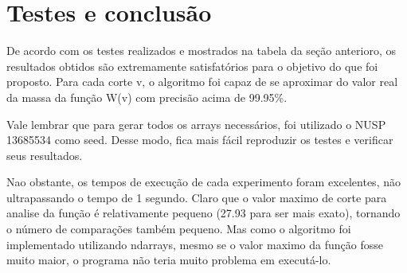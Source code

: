 \documentclass{article}
\begin{document}
    \section{Testes e conclusão}
    
    De acordo com os testes realizados e mostrados na tabela da seção anterioro, os resultados obtidos são extremamente satisfatórios para o objetivo do que foi proposto. Para cada corte v, o algoritmo foi capaz de se aproximar do valor real da massa da função W(v) com precisão acima de 99.95\%.
    
    Vale lembrar que para gerar todos os arrays necessários, foi utilizado o NUSP 13685534 como seed. Desse modo, fica mais fácil reproduzir os testes e verificar seus resultados.
    
    Nao obstante, os tempos de execução de cada experimento foram excelentes, não ultrapassando o tempo de 1 segundo. Claro que o valor maximo de corte para analise da função é relativamente pequeno (27.93 para ser mais exato), tornando o número de comparações também pequeno. Mas como o algoritmo foi implementado utilizando ndarrays, mesmo se o valor maximo da função fosse muito maior, o programa não teria muito problema em executá-lo.
\end{document}
